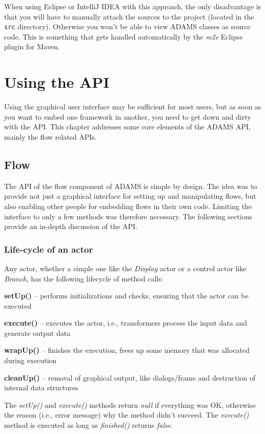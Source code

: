 When using Eclipse or IntelliJ IDEA with this approach, the only disadvantage is that you will
have to manually attach the sources to the project (located in the 
\texttt{src} directory). Otherwise you won't be able to view ADAMS classes
as source code. This is something that gets handled automatically by the
\textit{m2e} Eclipse plugin for Maven.

\chapter{Using the API}
Using the graphical user interface may be sufficient for most users, but as soon
as you want to embed one framework in another, you need to get down and dirty
with the API. This chapter addresses some core elements of the ADAMS API, mainly
the flow related APIs.

\section{Flow}
The API of the flow component of ADAMS is simple by design. The idea was to
provide not just a graphical interface for setting up and manipulating flows,
but also enabling other people for embedding flows in their own code. Limiting
the interface to only a few methods was therefore necessary. The following 
sections provide an in-depth discussion of the API.

\subsection{Life-cycle of an actor}
Any actor, whether a simple one like the \textit{Display} actor or a control
actor like \textit{Branch}, has the following lifecycle of method calls:
\begin{tight_itemize}
  \item \textbf{setUp()} -- performs initializations and checks, ensuring that
  the actor can be executed
  \item \textbf{execute()} -- executes the actor, i.e., transformers process the
  input data and generate output data
  \item \textbf{wrapUp()} -- finishes the execution, frees up some memory that
  was allocated during execution
  \item \textbf{cleanUp()} -- removal of graphical output, like dialogs/frame
  and destruction of internal data structures
\end{tight_itemize}
The \textit{setUp()} and \textit{execute()} methods return
\textit{null} if everything was OK, otherwise the reason (i.e., error message) why
the method didn't succeed. The \textit{execute()} method is executed as long as
\textit{finished()} returns \textit{false}.

